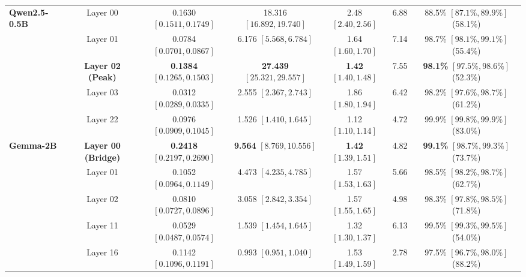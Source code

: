 \documentclass[11pt,a4paper]{article}
\theoremstyle{definition}
\theoremstyle{plain}
\begin{document}
\begin{table}[H]
{\begin{tabular}{lcccccc}
\midrule
\multirow{5}{*}{\textbf{Qwen2.5-0.5B}} & Layer 00 & 0.1630 \small{$[0.1511, 0.1749]$} & 18.316 \small{$[16.892, 19.740]$} & 2.48 \small{$[2.40, 2.56]$} & 6.88 & 88.5\% \small{$[87.1\%, 89.9\%]$} (58.1\%) \\
 & Layer 01 & 0.0784 \small{$[0.0701, 0.0867]$} & 6.176 \small{$[5.568, 6.784]$} & 1.64 \small{$[1.60, 1.70]$} & 7.14 & 98.7\% \small{$[98.1\%, 99.1\%]$} (55.4\%) \\
 & \textbf{Layer 02 (Peak)} & \textbf{0.1384} \small{$[0.1265, 0.1503]$} & \textbf{27.439} \small{$[25.321, 29.557]$} & \textbf{1.42} \small{$[1.40, 1.48]$} & 7.55 & \textbf{98.1\%} \small{$[97.5\%, 98.6\%]$} (52.3\%) \\
 & Layer 03 & 0.0312 \small{$[0.0289, 0.0335]$} & 2.555 \small{$[2.367, 2.743]$} & 1.86 \small{$[1.80, 1.94]$} & 6.42 & 98.2\% \small{$[97.6\%, 98.7\%]$} (61.2\%) \\
 & Layer 22 & 0.0976 \small{$[0.0909, 0.1045]$} & 1.526 \small{$[1.410, 1.645]$} & 1.12 \small{$[1.10, 1.14]$} & 4.72 & 99.9\% \small{$[99.8\%, 99.9\%]$} (83.0\%) \\
\midrule
\multirow{5}{*}{\textbf{Gemma-2B}} & \textbf{Layer 00 (Bridge)} & \textbf{0.2418} \small{$[0.2197, 0.2690]$} & \textbf{9.564} \small{$[8.769, 10.556]$} & \textbf{1.42} \small{$[1.39, 1.51]$} & 4.82 & \textbf{99.1\%} \small{$[98.7\%, 99.3\%]$} (73.7\%) \\
 & Layer 01 & 0.1052 \small{$[0.0964, 0.1149]$} & 4.473 \small{$[4.235, 4.785]$} & 1.57 \small{$[1.53, 1.63]$} & 5.66 & 98.5\% \small{$[98.2\%, 98.7\%]$} (62.7\%) \\
 & Layer 02 & 0.0810 \small{$[0.0727, 0.0896]$} & 3.058 \small{$[2.842, 3.354]$} & 1.57 \small{$[1.55, 1.65]$} & 4.98 & 98.3\% \small{$[97.8\%, 98.5\%]$} (71.8\%) \\
 & Layer 11 & 0.0529 \small{$[0.0487, 0.0574]$} & 1.539 \small{$[1.454, 1.645]$} & 1.32 \small{$[1.30, 1.37]$} & 6.13 & 99.5\% \small{$[99.3\%, 99.5\%]$} (54.0\%) \\
 & Layer 16 & 0.1142 \small{$[0.1096, 0.1191]$} & 0.993 \small{$[0.951, 1.040]$} & 1.53 \small{$[1.49, 1.59]$} & 2.78 & 97.5\% \small{$[96.7\%, 98.0\%]$} (88.2\%) \\
\bottomrule
\end{tabular}%
}
\end{table}
\end{document}
